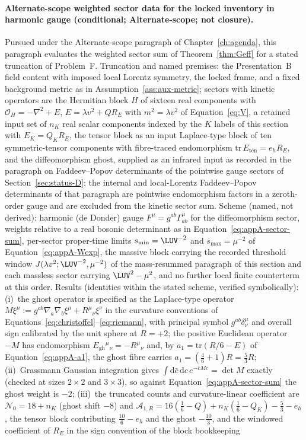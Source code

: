 \paragraph{Alternate-scope weighted sector data for the locked inventory in harmonic gauge (conditional; Alternate-scope; not closure).} Pursued under the Alternate-scope paragraph of Chapter~\ref{ch:agenda}, this paragraph evaluates the weighted sector sum of Theorem~\ref{thm:Geff} for a stated truncation of Problem~F. Truncation and named premises: the Presentation~B field content with imposed local Lorentz symmetry, the locked frame, and a fixed background metric as in Assumption~\ref{ass:aux-metric}; sectors with kinetic operators are the Hermitian block \(H\) of sixteen real components with \(\mathcal O_H=-\nabla^2+E\), \(E=\lambda v^2+Q R_E\) with \(m^2=\lambda v^2\) of Equation~\eqref{eq:V}, a retained input set of \(n_K\) real scalar components indexed by the \(K\) labels of this section with \(E_K=Q_K R_E\), the tensor block as an input Laplace-type block of ten symmetric-tensor components with fibre-traced endomorphism \(\mathrm{tr}\,E_{\mathrm{ten}}=e_h R_E\), and the diffeomorphism ghost, supplied as an infrared input as recorded in the paragraph on Faddeev--Popov determinants of the pointwise gauge sectors of Section~\ref{sec:status-D}; the internal and local-Lorentz Faddeev--Popov determinants of that paragraph are pointwise endomorphism factors in a zeroth-order gauge and are excluded from the kinetic sector sum. Scheme (named, not derived): harmonic (de Donder) gauge \(F^\mu=g^{ab}\Gamma^\mu_{ab}\) for the diffeomorphism sector, weights relative to a real bosonic determinant as in Equation~\eqref{eq:appA-sector-sum}, per-sector proper-time limits \(s_{\min}=\LUV^{-2}\) and \(s_{\max}=\mu^{-2}\) of Equation~\eqref{eq:appA-Wexp}, the massive block carrying the recorded threshold window \(J(\lambda v^2;\LUV^{-2},\mu^{-2})\) of the mass-resummed paragraph of this section and each massless sector carrying \(\LUV^2-\mu^2\), and no further local finite counterterm at this order. Results (identities within the stated scheme, verified symbolically): (i)~the ghost operator is specified as the Laplace-type operator \(M\xi^\mu:=g^{ab}\nabla_a\nabla_b\xi^\mu+R^\mu{}_\nu\xi^\nu\) in the curvature conventions of Equations~\eqref{eq:christoffel}--\eqref{eq:riemann}, with principal symbol \(g^{ab}\delta^\mu_\nu\) and overall sign calibrated by the unit sphere at \(R=+2\); the positive Euclidean operator \(-M\) has endomorphism \(E_{\mathrm{gh}}{}^\mu{}_\nu=-R^\mu{}_\nu\) and, by \(a_1=\mathrm{tr}(R/6-E)\) of Equation~\eqref{eq:appA-a1}, the ghost fibre carries \(a_1=(\tfrac46+1)R=\tfrac53R\); (ii)~Grassmann Gaussian integration gives \(\int\mathrm d\bar c\,\mathrm dc\,e^{-\bar c M c}=\det M\) exactly (checked at sizes \(2\times2\) and \(3\times3\)), so against Equation~\eqref{eq:appA-sector-sum} the ghost weight is \(-2\); (iii)~the truncated counts and curvature-linear coefficient are \(\mathcal N_0=18+n_K\) (ghost shift \(-8\)) and \(\mathcal A_{1,R}=16(\tfrac16-Q)+n_K(\tfrac16-Q_K)-\tfrac53-e_h\), the tensor block contributing \(\tfrac{10}{6}-e_h\) and the ghost \(-\tfrac{10}{3}\), and the windowed coefficient of \(R_E\) in the sign convention of the block bookkeeping 